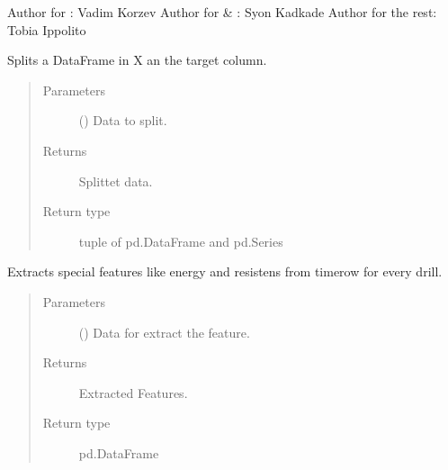 \documentclass[letterpaper,10pt,english]{sphinxmanual}
\begin{document}
\sphinxAtStartPar
Author for : Vadim Korzev
Author for  \& : Syon Kadkade
Author for the rest: Tobia Ippolito

\begin{fulllineitems}
\label{\detokenize{anoog.io:anoog.io.data_io.X_y_split}}
\sphinxAtStartPar
Splits a DataFrame in X an the target column.
\begin{quote}\begin{description}
\item[{Parameters}] \leavevmode
\sphinxAtStartPar
{} () \textendash{} Data to split.

\item[{Returns}] \leavevmode
\sphinxAtStartPar
Splittet data.

\item[{Return type}] \leavevmode
\sphinxAtStartPar
tuple of pd.DataFrame and pd.Series

\end{description}\end{quote}

\end{fulllineitems}


\begin{fulllineitems}
\label{\detokenize{anoog.io:anoog.io.data_io.advanced_feature_extraction}}
\sphinxAtStartPar
Extracts special features like energy and resistens from timerow for every drill.
\begin{quote}\begin{description}
\item[{Parameters}] \leavevmode
\sphinxAtStartPar
{} () \textendash{} Data for extract the feature.

\item[{Returns}] \leavevmode
\sphinxAtStartPar
Extracted Features.

\item[{Return type}] \leavevmode
\sphinxAtStartPar
pd.DataFrame

\end{description}\end{quote}

\end{fulllineitems}
\end{document}

